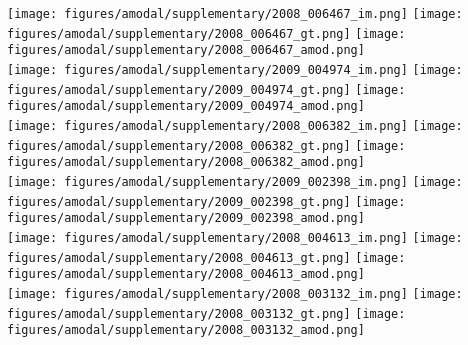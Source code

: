 \begin{figure*}
\centering\texttt{[image: figures/amodal/supplementary/2008\_006467\_im.png]}
\texttt{[image: figures/amodal/supplementary/2008\_006467\_gt.png]}
\texttt{[image: figures/amodal/supplementary/2008\_006467\_amod.png]} \\ 
\texttt{[image: figures/amodal/supplementary/2009\_004974\_im.png]}
\texttt{[image: figures/amodal/supplementary/2009\_004974\_gt.png]}
\texttt{[image: figures/amodal/supplementary/2009\_004974\_amod.png]} \\ 
\texttt{[image: figures/amodal/supplementary/2008\_006382\_im.png]}
\texttt{[image: figures/amodal/supplementary/2008\_006382\_gt.png]}
\texttt{[image: figures/amodal/supplementary/2008\_006382\_amod.png]} \\ 
\texttt{[image: figures/amodal/supplementary/2009\_002398\_im.png]}
\texttt{[image: figures/amodal/supplementary/2009\_002398\_gt.png]}
\texttt{[image: figures/amodal/supplementary/2009\_002398\_amod.png]} \\ 
\texttt{[image: figures/amodal/supplementary/2008\_004613\_im.png]}
\texttt{[image: figures/amodal/supplementary/2008\_004613\_gt.png]}
\texttt{[image: figures/amodal/supplementary/2008\_004613\_amod.png]} \\ 
\texttt{[image: figures/amodal/supplementary/2008\_003132\_im.png]}
\texttt{[image: figures/amodal/supplementary/2008\_003132\_gt.png]}
\texttt{[image: figures/amodal/supplementary/2008\_003132\_amod.png]} \\ 
\end{figure*}
